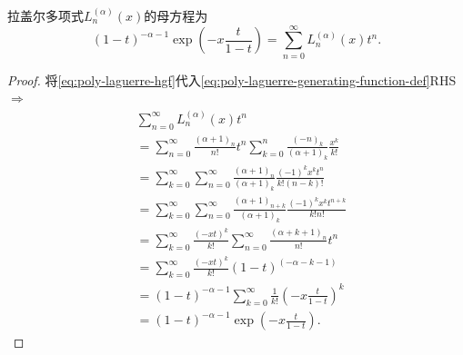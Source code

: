 \begin{subappendices}
\begin{theorem}[拉盖尔多项式的母方程]
  拉盖尔多项式$L_n^{(\alpha)}(x)$的母方程为
  \begin{equation}
    \label{eq:poly-laguerre-generating-function-def}
    (1-t)^{-\alpha - 1} \exp \left( - x \frac{t}{1-t} \right) = \sum_{n=0}^{\infty} L_n^{(\alpha)}(x) t^n.
  \end{equation}
\end{theorem}
\begin{proof}
将\eqref{eq:poly-laguerre-hgf}代入\eqref{eq:poly-laguerre-generating-function-def}RHS $\Rightarrow$
\begin{equation*}
  \begin{split}
    &\sum_{n=0}^{\infty} L_n^{(\alpha)}(x) t^n \\
    &=\sum_{n=0}^{\infty} \frac{(\alpha+1)_n}{n!} t^n \sum_{k=0}^{n} \frac{
    (-n)_k
    }{
    (\alpha + 1)_k
    } \frac{
    x^k
    }{k!}\\
    &=\sum_{k=0}^{\infty} \sum_{n=0}^{\infty} \frac{(\alpha+1)_n}{(\alpha+1)_k} \frac{
    (-1)^k x^k t^n
    }{
    k! (n-k)!
    } \\
    &=\sum_{k=0}^{\infty} \sum_{n=0}^{\infty}
    \frac{(\alpha+1)_{n+k}}{(\alpha+1)_k}
    \frac{(-1)^k x^k t^{n+k}}{k! n!}\\
    &= \sum_{k=0}^{\infty} \frac{(- x t)^k}{k!}
    \sum_{n=0}^{\infty} \frac{(\alpha + k + 1)_n}{n!} t^n \\
    &=\sum_{k=0}^{\infty} \frac{(-xt)^k}{k!} (1-t)^{(-\alpha - k - 1)}\\
    &=(1-t)^{-\alpha -1} \sum_{k=0}^{\infty} \frac{1}{k!} \left(- x \frac{t}{1-t} \right)^{k}\\
    &=(1-t)^{-\alpha - 1} \exp \left( - x \frac{t}{1-t} \right).
  \end{split}
\end{equation*}
\end{proof}


\end{subappendices}
